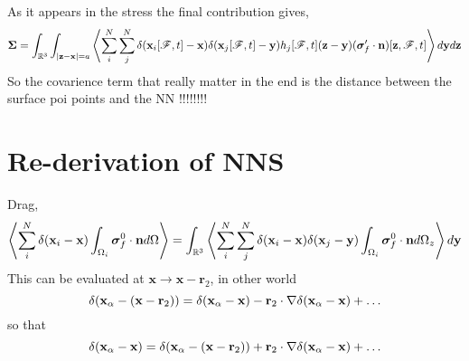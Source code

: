 \documentclass[12pt]{My_preprint}
\begin{document}
As it appears in the stress the final contribution gives, 
\begin{equation}
    \bm\Sigma
    = 
    \int_{\mathbb{R}^3}
    \int_{|\textbf{z} - \textbf{x}| = a}
    \avg{
        \sum_i^N
        \sum_j^N 
        \delta(\textbf{x}_i[\FF,t] - \textbf{x})
        \delta(\textbf{x}_j[\FF,t] - \textbf{y})
        h_j[\FF,t]
        (\textbf{z} - \textbf{y})(\bm\sigma_f'\cdot\textbf{n})[\textbf{z},\FF,t]
    }
    d\textbf{y}
    d\textbf{z}
\end{equation}
So the covarience term that really matter in the end is the distance between the surface poi points and the NN !!!!!!!!

\section*{Re-derivation of NNS}
Drag, 
\begin{equation}
    \avg{\sum_i^N  \delta(\textbf{x}_i - \textbf{x}) \intO[i]{\bm\sigma_f^0 \cdot \textbf{n}}}
    = 
    \int_{\mathbb{R}^3} 
    \avg{
        \sum_i^N 
        \sum_j^N 
        \delta(\textbf{x}_i - \textbf{x}) 
        \delta(\textbf{x}_j - \textbf{y}) 
        \intO[i]{\bm\sigma_f^0 \cdot \textbf{n}}_z
        }
        d\textbf{y}
\end{equation}
This can be evaluated at $\textbf{x} \to \textbf{x} - \textbf{r}_2$, in other world 
\begin{equation}
    \delta(\textbf{x}_\alpha - (\textbf{x} - \textbf{r}_2))
    = \delta(\textbf{x}_\alpha- \textbf{x} )
    - \textbf{r}_2 \cdot \grad \delta(\textbf{x}_\alpha- \textbf{x} )
    + \ldots
\end{equation}
so that
\begin{equation}
    \delta(\textbf{x}_\alpha- \textbf{x} )
    = \delta(\textbf{x}_\alpha - (\textbf{x} - \textbf{r}_2))
    + \textbf{r}_2 \cdot \grad \delta(\textbf{x}_\alpha- \textbf{x} )
    + \ldots
\end{equation}
\end{document}
